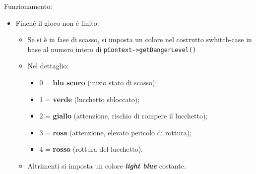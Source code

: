 Funzionamento:
\begin{itemize}
	\item Finché il gioco non è finito:
	\begin{itemize}
		\item Se si è in fase di scasso, si imposta un colore nel costrutto swhitch-case in base al numero intero di \texttt{pContext->getDangerLevel()}
			\item Nel dettaglio:
			\begin{itemize}
				\item 0 = \textbf{blu scuro} (inizio stato di scasso); 
				\item 1 = \textbf{verde} (lucchetto sbloccato);
				\item 2 = \textbf{giallo} (attenzione, rischio di rompere il lucchetto);
				\item 3 = \textbf{rosa} (attenzione, elevato pericolo di rottura);
				\item 4 = \textbf{rosso} (rottura del lucchetto).
			\end{itemize}
		\item Altrimenti si imposta un colore \textbf{\textit{light blue}} costante.
	\end{itemize}
\end{itemize}





